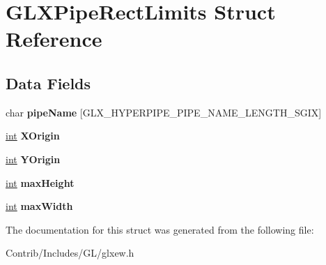 \hypertarget{struct_g_l_x_pipe_rect_limits}{}\section{G\+L\+X\+Pipe\+Rect\+Limits Struct Reference}
\label{struct_g_l_x_pipe_rect_limits}
\subsection*{Data Fields}
\begin{DoxyCompactItemize}
\item 
char {\bfseries pipe\+Name} \mbox{[}G\+L\+X\+\_\+\+H\+Y\+P\+E\+R\+P\+I\+P\+E\+\_\+\+P\+I\+P\+E\+\_\+\+N\+A\+M\+E\+\_\+\+L\+E\+N\+G\+T\+H\+\_\+\+S\+G\+IX\mbox{]}\hypertarget{struct_g_l_x_pipe_rect_limits_accd4726a34638a32d105c6b9410837d3}{}\label{struct_g_l_x_pipe_rect_limits_accd4726a34638a32d105c6b9410837d3}

\item 
\hyperlink{_s_d_l__thread_8h_a6a64f9be4433e4de6e2f2f548cf3c08e}{int} {\bfseries X\+Origin}\hypertarget{struct_g_l_x_pipe_rect_limits_a4b1416fbb927771ddfef3aef9b597893}{}\label{struct_g_l_x_pipe_rect_limits_a4b1416fbb927771ddfef3aef9b597893}

\item 
\hyperlink{_s_d_l__thread_8h_a6a64f9be4433e4de6e2f2f548cf3c08e}{int} {\bfseries Y\+Origin}\hypertarget{struct_g_l_x_pipe_rect_limits_a735166a0872eb92f7875ecde6ede2060}{}\label{struct_g_l_x_pipe_rect_limits_a735166a0872eb92f7875ecde6ede2060}

\item 
\hyperlink{_s_d_l__thread_8h_a6a64f9be4433e4de6e2f2f548cf3c08e}{int} {\bfseries max\+Height}\hypertarget{struct_g_l_x_pipe_rect_limits_a6b5da86bc1dbe6625fe489986ad3520d}{}\label{struct_g_l_x_pipe_rect_limits_a6b5da86bc1dbe6625fe489986ad3520d}

\item 
\hyperlink{_s_d_l__thread_8h_a6a64f9be4433e4de6e2f2f548cf3c08e}{int} {\bfseries max\+Width}\hypertarget{struct_g_l_x_pipe_rect_limits_ac78ad025d5ad2100193d42ab9c1a963e}{}\label{struct_g_l_x_pipe_rect_limits_ac78ad025d5ad2100193d42ab9c1a963e}

\end{DoxyCompactItemize}


The documentation for this struct was generated from the following file\+:\begin{DoxyCompactItemize}
\item 
Contrib/\+Includes/\+G\+L/glxew.\+h\end{DoxyCompactItemize}
